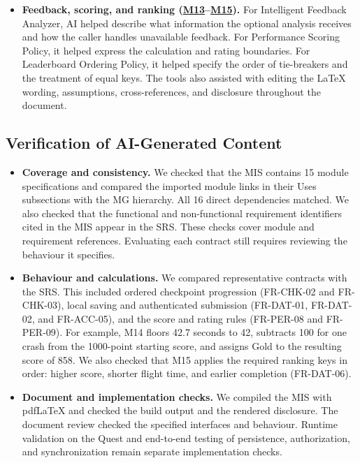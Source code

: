 \documentclass[12pt, titlepage]{article}
\newcommand{\Mref}[1]{\hyperref[sec:M#1]{M#1}}
\begin{document}
\begin{itemize}
\item \textbf{Feedback, scoring, and ranking
(\Mref{13}--\Mref{15}).}
For Intelligent Feedback Analyzer, AI helped describe what information
the optional analysis receives and how the caller handles unavailable
feedback. For Performance Scoring Policy, it helped express the
calculation and rating boundaries. For Leaderboard Ordering Policy, it
helped specify the order of tie-breakers and the treatment of equal
keys. The tools also assisted with editing the LaTeX wording,
assumptions, cross-references, and disclosure throughout the document.
\end{itemize}

\subsection{Verification of AI-Generated Content}

\begin{itemize}
\item \textbf{Coverage and consistency.} We checked that the MIS contains
15 module specifications and compared the imported module links in their
Uses subsections with the MG hierarchy. All 16 direct dependencies matched.
We also checked that the functional and non-functional requirement
identifiers cited in the MIS appear in the SRS. These checks cover module
and requirement references. Evaluating each contract still requires
reviewing the behaviour it specifies.

\item \textbf{Behaviour and calculations.} We compared representative
contracts with the SRS. This included ordered checkpoint progression
(FR-CHK-02 and FR-CHK-03), local saving and authenticated submission
(FR-DAT-01, FR-DAT-02, and FR-ACC-05), and the score and rating rules
(FR-PER-08 and FR-PER-09). For example, M14 floors 42.7 seconds to 42,
subtracts 100 for one crash from the 1000-point starting score, and
assigns Gold to the resulting score of 858. We also checked that M15
applies the required ranking keys in order: higher score, shorter flight
time, and earlier completion (FR-DAT-06).

\item \textbf{Document and implementation checks.} We compiled the MIS
with pdfLaTeX and checked the build output and the rendered disclosure.
The document review checked the specified interfaces and behaviour.
Runtime validation on the Quest and end-to-end testing of persistence,
authorization, and synchronization remain separate implementation checks.
\end{itemize}
\end{document}
